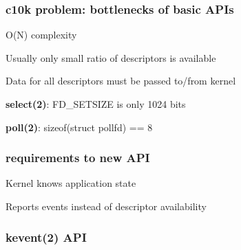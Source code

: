 \documentclass{beamer}
\begin{document}
\FootReferences{}{}
\begin{frame}
\frametitle{c10k problem: bottlenecks of basic APIs}
\begin{itemize}
 {
  \item {O(N) complexity}
}
 {
  \item {Usually only small ratio of descriptors is available}
  \item {Data for all descriptors must be passed to/from kernel}
}
 {
  \item {\textbf{select(2)}: FD\_SETSIZE is only 1024 bits}
}
 {
  \item {\textbf{poll(2)}: sizeof(struct pollfd) == 8}
}
\end{itemize}
\end{frame}


\FootReferences{}{}
\begin{frame}
\frametitle{requirements to new API}
\begin{itemize}
 {
  \item {Kernel knows application state}
}
 {
  \item {Reports events instead of descriptor availability}
}
\end{itemize}
\end{frame}


\FootReferences{}{}
\begin{frame}
\begin{figure}
\end{figure}
\end{frame}


\begin{frame}
\frametitle{kevent(2) API}
\end{frame}
\end{document}
